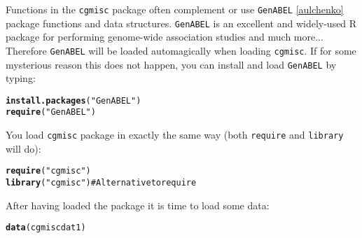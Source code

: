 \documentclass{article}\usepackage{graphicx, color}
\makeatletter
\newcommand{\hlfunctioncall}[1]{\textcolor[rgb]{0.501960784313725,0,0.329411764705882}{\textbf{#1}}}%
\newcommand{\hlstring}[1]{\textcolor[rgb]{0.6,0.6,1}{#1}}%
\newenvironment{kframe}{%
 \def\at@end@of@kframe{}%
 \ifinner\ifhmode%
  \def\at@end@of@kframe{\end{minipage}}%
  \begin{minipage}{\columnwidth}%
 \fi\fi%
 \def\FrameCommand##1{\hskip\@totalleftmargin \hskip-\fboxsep
 \colorbox{shadecolor}{##1}\hskip-\fboxsep
     \hskip-\linewidth \hskip-\@totalleftmargin \hskip\columnwidth}%
 \MakeFramed {\advance\hsize-\width
   \@totalleftmargin\z@ \linewidth\hsize
   \@setminipage}}%
 {\par\unskip\endMakeFramed%
 \at@end@of@kframe}
\newenvironment{knitrout}{}{} %
\makeatother
\begin{document}
\noindent Functions in the {\tt cgmisc} package often complement or use {\tt GenABEL} \ref{aulchenko} package functions and data structures. {\tt GenABEL} is an excellent and widely-used R package for performing genome-wide association studies and much more... Therefore {\tt GenABEL} will be loaded automagically when loading {\tt cgmisc}. If for some mysterious reason this does not happen, you can install and load {\tt GenABEL} by typing:
\begin{knitrout}
\color{fgcolor}\begin{kframe}
\begin{alltt}
\hlfunctioncall{install.packages}(\hlstring{"GenABEL"})
\hlfunctioncall{require}(\hlstring{"GenABEL"})
\end{alltt}
\end{kframe}
\end{knitrout}

\noindent You load {\tt cgmisc} package in exactly the same way (both {\tt require} and {\tt library} will do):
\begin{knitrout}
\color{fgcolor}\begin{kframe}
\begin{alltt}
\hlfunctioncall{require}(\hlstring{"cgmisc"})
\hlfunctioncall{library}(\hlstring{"cgmisc"})  # Alternative to require
\end{alltt}
\end{kframe}
\end{knitrout}

\noindent After having loaded the package it is time to load some data:
\begin{knitrout}
\color{fgcolor}\begin{kframe}
\begin{alltt}
\hlfunctioncall{data}(cgmiscdat1)
\end{alltt}


{\ttfamily\noindent\color{warningcolor}{\#\# Warning: data set 'cgmiscdat1' not found}}\end{kframe}
\end{knitrout}
\end{document}
